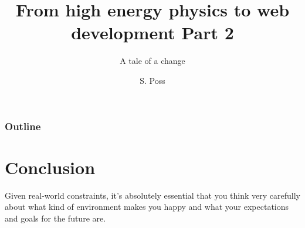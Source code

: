 \documentclass[]{beamer}
\author{S. Poss}
\title{From high energy physics to web development Part 2}
\subtitle{A tale of a change}
\begin{document}
\begin{frame}
\titlepage
\end{frame}

\begin{frame}
\frametitle{Outline}
\tableofcontents
\end{frame}


\section{Conclusion}
\begin{frame}
\centering
Given real-world constraints, it's absolutely essential that you think very carefully about what kind of environment makes you happy and what your expectations and goals for the future are.
\end{frame}
\end{document}
